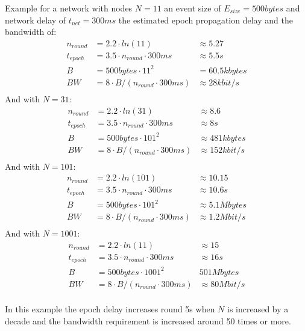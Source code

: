 Example for a network with nodes $N=11$ an event size of $E_{size}=500bytes$ and network delay of $t_{net}=300ms$ the estimated epoch propagation delay
and the bandwidth of:
\begin{align*}
n_{round} &= 2.2 \cdot ln(11) &\approx  5.27\\
t_{epoch} &= 3.5 \cdot n_{round} \cdot 300ms & \approx 5.5s \\
B &= 500bytes \cdot 11^2 &= 60.5kbytes \\
BW &= 8 \cdot B / (n_{round}\cdot 300ms) &\approx 28kbit/s \\
\end{align*}
And with $N=31$:
\begin{align*}
n_{round} &= 2.2 \cdot ln(31) & \approx  8.6\\
t_{epoch} &= 3.5 \cdot n_{round} \cdot 300ms & \approx 8s \\
B &= 500bytes \cdot 101^2 & \approx 481kbytes \\
BW &= 8 \cdot B / (n_{round}\cdot 300ms) &\approx 152kbit/s \\
\end{align*}
And with $N=101$:
\begin{align*}
n_{round} &= 2.2 \cdot ln(101) & \approx  10.15\\
t_{epoch} &= 3.5 \cdot n_{round} \cdot 300ms & \approx 10.6s \\
B &= 500bytes \cdot 101^2 & \approx 5.1Mbytes \\
BW &= 8 \cdot B / (n_{round}\cdot 300ms) &\approx 1.2Mbit/s \\
\end{align*}
And with $N=1001$:
\begin{align*}
n_{round} &= 2.2 \cdot ln(11) & \approx  15\\
t_{epoch} &= 3.5 \cdot n_{round} \cdot 300ms & \approx 16s \\
B &= 500bytes \cdot 1001^2 & 501Mbytes \\
BW &= 8 \cdot B / (n_{round}\cdot 300ms) &\approx 80Mbit/s \\
\end{align*}

In this example the epoch delay increases round 5s when $N$ is increased by a decade and the bandwidth requirement is increased around 50 times or more.

